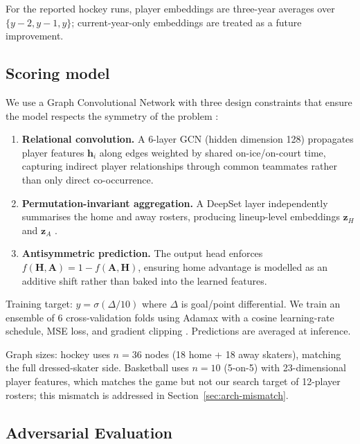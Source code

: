 \documentclass[12pt,letterpaper]{article}
\begin{document}
For the reported hockey runs, player embeddings are three-year averages
over $\{y-2, y-1, y\}$; current-year-only embeddings are treated as a
future improvement.

\subsection{Scoring model}

We use a Graph Convolutional Network with three design constraints that
ensure the model respects the symmetry of the problem
\citep{kipf2017gcn}:

\begin{enumerate}[leftmargin=*]
  \item \textbf{Relational convolution.} A 6-layer GCN (hidden
    dimension 128) propagates player features $\mathbf{h}_i$ along
    edges weighted by shared on-ice/on-court time, capturing indirect
    player relationships through common teammates rather than only
    direct co-occurrence.
  \item \textbf{Permutation-invariant aggregation.} A DeepSet layer
    independently summarises the home and away rosters, producing
    lineup-level embeddings $\mathbf{z}_H$ and $\mathbf{z}_A$
    \citep{zaheer2017deepsets}.
  \item \textbf{Antisymmetric prediction.} The output head enforces
    $f(\mathbf{H}, \mathbf{A}) = 1 - f(\mathbf{A}, \mathbf{H})$,
    ensuring home advantage is modelled as an additive shift rather
    than baked into the learned features.
\end{enumerate}

Training target: $y = \sigma(\Delta / 10)$ where $\Delta$ is
goal/point differential.
We train an ensemble of 6 cross-validation folds using Adamax with a
cosine learning-rate schedule, MSE loss, and gradient clipping
\citep{kingma2015adam,loshchilov2017sgdr}.
Predictions are averaged at inference.

Graph sizes: hockey uses $n = 36$ nodes (18 home + 18 away skaters),
matching the full dressed-skater side.
Basketball uses $n = 10$ (5-on-5) with 23-dimensional player features,
which matches the game but not our search target of 12-player rosters;
this mismatch is addressed in Section~\ref{sec:arch-mismatch}.

\subsection{Adversarial Evaluation}
\end{document}
